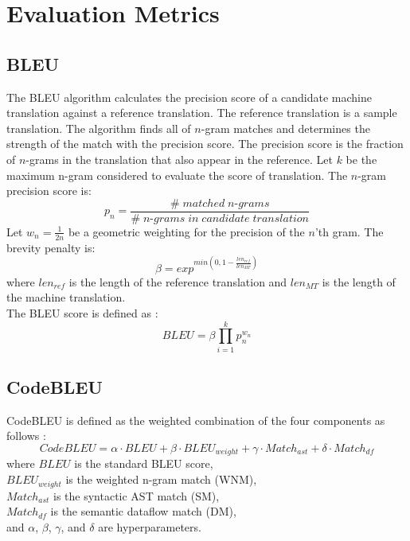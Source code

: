 \section{Evaluation Metrics}
\subsection{BLEU}
The BLEU algorithm calculates the precision score of a candidate machine translation against a reference translation. The reference translation is a sample translation. The algorithm finds all of $n$-gram matches and determines the strength of the match with the precision score. The precision score is the fraction of $n$-grams in the translation that also appear in the reference. Let $k$ be the maximum n-gram considered to evaluate the score of translation. The $n$-gram precision score is:
\begin{equation}
\label{eq:2.25}
p_n = \frac{\# \; matched \; n\mbox{-}grams}{\# \; n\mbox{-}grams \; in \; candidate \; translation}
\end{equation}
Let $w_n = \frac{1}{2n}$  be a geometric weighting for the precision of the $n$'th gram. The brevity penalty is:
\begin{equation}
\label{eq:2.26}
\beta = exp ^ {min \left(0, 1 - \frac{len_{ref}}{len_{MT}} \right)}
\end{equation}
where $len_{ref}$ is the length of the reference translation and $len_{MT}$ is the length of the machine translation. \\
The BLEU score is defined as \cite{manning2019cs224n}:
\begin{equation}
\label{eq:2.27}
BLEU = \beta \prod _{i = 1} ^ k p_n ^{w_n}
\end{equation}

\subsection{CodeBLEU}
CodeBLEU is defined as the weighted combination of the four components as follows \cite{ren2020codebleu}:
\begin{equation}
\label{eq:2.28}
CodeBLEU = \alpha \cdot BLEU + \beta \cdot BLEU_{weight} + \gamma \cdot Match_{ast} + \delta \cdot Match_{df}
\end{equation}
where $BLEU$ is the standard BLEU score, \\
\hspace*{10mm} $BLEU_{weight}$ is the weighted n-gram match (WNM), \\
\hspace*{10mm} $Match_{ast}$ is the syntactic AST match (SM), \\
\hspace*{10mm} $Match_{df}$ is the semantic dataflow match (DM), \\
\hspace*{10mm} and $\alpha$, $\beta$, $\gamma$, and $\delta$ are hyperparameters.